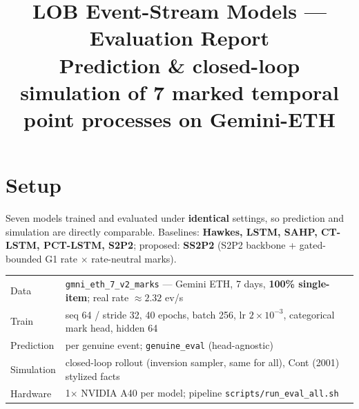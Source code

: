 \documentclass[11pt]{article}
\title{\textbf{LOB Event-Stream Models — Evaluation Report}\\[2pt]
\large Prediction \& closed-loop simulation of 7 marked temporal point processes on Gemini-ETH}
\author{}\date{}
\begin{document}
\maketitle\vspace{-2.6em}

\section{Setup}
Seven models trained and evaluated under \textbf{identical} settings, so prediction and simulation
are directly comparable. Baselines: \textbf{Hawkes, LSTM, SAHP, CT-LSTM, PCT-LSTM, S2P2}; proposed:
\textbf{SS2P2} (S2P2 backbone + gated-bounded G1 rate $\times$ rate-neutral marks).
\begin{center}\small\renewcommand{\arraystretch}{1.1}
\begin{tabular}{ll}
\toprule
Data & \texttt{gmni\_eth\_7\_v2\_marks} — Gemini ETH, 7 days, \textbf{100\% single-item}; real rate $\approx2.32$ ev/s\\
Train & seq 64 / stride 32, 40 epochs, batch 256, lr $2\times10^{-3}$, categorical mark head, hidden 64\\
Prediction & per genuine event; \texttt{genuine\_eval} (head-agnostic)\\
Simulation & closed-loop rollout (inversion sampler, same for all), Cont (2001) stylized facts\\
Hardware & 1$\times$ NVIDIA A40 per model; pipeline \texttt{scripts/run\_eval\_all.sh}\\
\bottomrule
\end{tabular}
\end{center}
\end{document}
